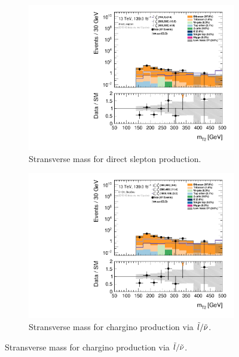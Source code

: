 \begin{figure}[H]
\centering
    \begin{subfigure}[t!]{0.49\textwidth}
        \includegraphics[width=\textwidth]{Figures/cutandcount/hist1d_mt2_direct_slepton.pdf}
    \caption{Stransverse mass for direct slepton production.}
    \label{fig:my_label}
    \end{subfigure}
    \begin{subfigure}[t!]{0.49\textwidth}
        \includegraphics[width=\textwidth]{Figures/cutandcount/hist1d_mt2_C1C1_SlepSnu.pdf}
    \caption{Stransverse mass for chargino production via $\Tilde{l}/\Tilde{\nu}$.}

\end{subfigure}
\end{figure}
